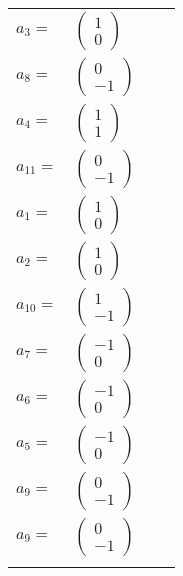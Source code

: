 \documentclass[1p]{elsarticle_modified}
\theoremstyle{definition}
\begin{document}
\begin{tabular}{m{7pt} m{180pt} m{7pt} m{180pt} }
\flushright $a_{3}=$&$\begin{pmatrix}1\\0\end{pmatrix}$ \\
\flushright $a_{8}=$&$\begin{pmatrix}0\\-1\end{pmatrix}$ \\
\flushright $a_{4}=$&$\begin{pmatrix}1\\1\end{pmatrix}$ \\
\flushright $a_{11}=$&$\begin{pmatrix}0\\-1\end{pmatrix}$ \\
\flushright $a_{1}=$&$\begin{pmatrix}1\\0\end{pmatrix}$ \\
\flushright $a_{2}=$&$\begin{pmatrix}1\\0\end{pmatrix}$ \\
\flushright $a_{10}=$&$\begin{pmatrix}1\\-1\end{pmatrix}$ \\
\flushright $a_{7}=$&$\begin{pmatrix}-1\\0\end{pmatrix}$ \\
\flushright $a_{6}=$&$\begin{pmatrix}-1\\0\end{pmatrix}$ \\
\flushright $a_{5}=$&$\begin{pmatrix}-1\\0\end{pmatrix}$ \\
\flushright $a_{9}=$&$\begin{pmatrix}0\\-1\end{pmatrix}$\\ \flushright $a_{9}=$&$\begin{pmatrix}0\\-1\end{pmatrix}$\\&\end{tabular}
\end{document}
